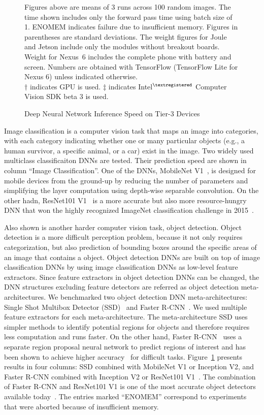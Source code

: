 \begin{figure}
\begin{captiontext}
Figures above are means of 3 runs across 100 random images. The time shown
includes only the forward pass time using batch size of 1. ENOMEM indicates
failure due to insufficient memory. Figures in parentheses are standard
deviations. The weight figures for Joule and Jetson include only the modules
without breakout boards. Weight for Nexus~6 includes the complete phone with
battery and screen. Numbers are obtained with TensorFlow (TensorFlow Lite for
Nexus 6) unless indicated otherwise. \\
$\dagger$ indicates GPU is used. $\ddagger$ indicates
Intel$^{\tiny\textregistered}$ Computer Vision SDK beta 3 is used.
\end{captiontext}
\caption{Deep Neural Network Inference Speed on Tier-3 Devices}
\label{fig:onboard-dnn-speed}
\end{figure}

Image classification is a computer vision task that maps an image into
categories, with each category indicating whether one or many particular objects
(e.g., a human survivor, a specific animal, or a car) exist in the image. Two
widely used multiclass classificaiton DNNs are tested. Their prediction speed
are shown in column ``Image Classification''. One of the DNNs, MobileNet
V1~\cite{Howard2017}, is designed for mobile devices from the ground-up by
reducing the number of parameters and simplifying the layer computation using
depth-wise separable convolution. On the other hadn, ResNet101 V1~\cite{He2016}
is a more accurate but also more resource-hungry DNN that won the highly
recognized ImageNet classification challenge in 2015~\cite{Russakovsky15}. 

Also shown is another harder computer vision task, object detection. Object
detection is a more difficult perception problem, because it not only requires
categorization, but also prediction of bounding boxes around the specific areas
of an image that contains a object. Object detection DNNs
are built on top of image classification DNNs by using image classification DNNs
as low-level feature extractors. Since feature extractors in object detection
DNNs can be changed, the DNN structures excluding feature detectors are referred
as object detection meta-architectures. We benchmarked two object detection DNN
meta-architectures: Single Shot Multibox Detector (SSD)~\cite{Liu2016} and
Faster R-CNN~\cite{Ren2015}. We used multiple feature extractors for each
meta-architecture. The meta-architecture SSD uses simpler methods to identify
potential regions for objects and therefore requires less computation and runs
faster. On the other hand, Faster R-CNN~\cite{Ren2015} uses a separate region
proposal neural network to predict regions of interest and has been shown to
achieve higher accuracy~\cite{Huang2017} for difficult tasks.
Figure~\ref{fig:onboard-dnn-speed} presents results in four columns: SSD
combined with MobileNet V1 or Inception V2, and Faster R-CNN combined with
Inception V2 or ResNet101 V1~\cite{He2016}. The combination of Faster R-CNN and
ResNet101 V1 is one of the most accurate object detectors available
today~\cite{Russakovsky15}. The entries marked ``{\sc ENOMEM}'' correspond to
experiments that were aborted because of insufficient memory.

